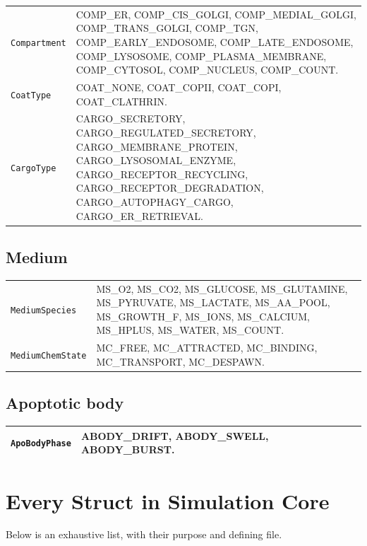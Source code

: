 \documentclass[11pt,letterpaper,twoside,openany]{book}
\newcommand{\code}[1]{\texttt{#1}}
\begin{document}
\begin{longtable}{p{4.2cm}p{10.0cm}}
\toprule
\code{Compartment} & COMP\_ER, COMP\_CIS\_GOLGI, COMP\_MEDIAL\_GOLGI, COMP\_TRANS\_GOLGI, COMP\_TGN, COMP\_EARLY\_ENDOSOME, COMP\_LATE\_ENDOSOME, COMP\_LYSOSOME, COMP\_PLASMA\_MEMBRANE, COMP\_CYTOSOL, COMP\_NUCLEUS, COMP\_COUNT.\\
\code{CoatType}    & COAT\_NONE, COAT\_COPII, COAT\_COPI, COAT\_CLATHRIN.\\
\code{CargoType}   & CARGO\_SECRETORY, CARGO\_REGULATED\_SECRETORY, CARGO\_MEMBRANE\_PROTEIN, CARGO\_LYSOSOMAL\_ENZYME, CARGO\_RECEPTOR\_RECYCLING, CARGO\_RECEPTOR\_DEGRADATION, CARGO\_AUTOPHAGY\_CARGO, CARGO\_ER\_RETRIEVAL.\\
\bottomrule
\end{longtable}

\section{Medium}

\begin{longtable}{p{4.2cm}p{10.0cm}}
\toprule
\code{MediumSpecies} & MS\_O2, MS\_CO2, MS\_GLUCOSE, MS\_GLUTAMINE, MS\_PYRUVATE, MS\_LACTATE, MS\_AA\_POOL, MS\_GROWTH\_F, MS\_IONS, MS\_CALCIUM, MS\_HPLUS, MS\_WATER, MS\_COUNT.\\
\code{MediumChemState} & MC\_FREE, MC\_ATTRACTED, MC\_BINDING, MC\_TRANSPORT, MC\_DESPAWN.\\
\bottomrule
\end{longtable}

\section{Apoptotic body}

\begin{longtable}{p{4.2cm}p{10.0cm}}
\toprule
\code{ApoBodyPhase} & ABODY\_DRIFT, ABODY\_SWELL, ABODY\_BURST.\\
\bottomrule
\end{longtable}

\chapter{Every Struct in Simulation Core}
\label{ch:structs}

Below is an exhaustive list, with their purpose and defining file.
\end{document}

